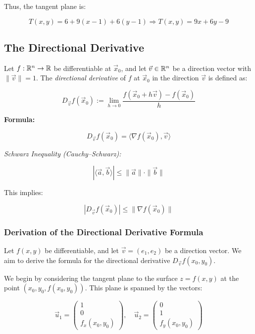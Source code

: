 Thus, the tangent plane is:

\[
    T(x, y) = 6 + 9(x - 1) + 6(y - 1)
    \Rightarrow T(x, y) = 9x + 6y - 9
\]

\subsection{The Directional Derivative}

Let \( f : \mathbb{R}^n \to \mathbb{R} \) be differentiable at \( \vec{x}_0 \), 
and let \( \vec{v} \in \mathbb{R}^n \) be a direction vector with \( \|\vec{v}\| = 1 \). The 
\emph{directional derivative} of \( f \) at \( \vec{x}_0 \) in the direction \( \vec{v} \) is defined as:

\[
    D_{\vec{v}}f(\vec{x}_0) := \lim_{h \to 0} \frac{f(\vec{x}_0 + h\vec{v}) - f(\vec{x}_0)}{h}
\]

\textbf{Formula:}

\[
    D_{\vec{v}}f(\vec{x}_0) = \langle \nabla f(\vec{x}_0), \vec{v} \rangle
\]

\emph{Schwarz Inequality (Cauchy–Schwarz):}

\[
    |\langle \vec{a}, \vec{b} \rangle| \le \|\vec{a}\| \cdot \|\vec{b}\|
\]

This implies:

\[
    |D_{\vec{v}}f(\vec{x}_0)| \le \|\nabla f(\vec{x}_0)\|
\]

\subsubsection{Derivation of the Directional Derivative Formula}

Let \( f(x, y) \) be differentiable, and let \( \vec{v} = (e_1, e_2) \) be a direction vector. We aim to derive the formula for the directional derivative \( D_{\vec{v}} f(x_0, y_0) \).

We begin by considering the tangent plane to the surface \( z = f(x, y) \) at the point \( (x_0, y_0, f(x_0, y_0)) \). This plane is spanned by the vectors:

\[
    \vec{u}_1 = 
    \begin{pmatrix}
    1 \\
    0 \\
    f_x(x_0, y_0)
    \end{pmatrix}, \quad
    \vec{u}_2 = 
    \begin{pmatrix}
    0 \\
    1 \\
    f_y(x_0, y_0)
    \end{pmatrix}
\]

